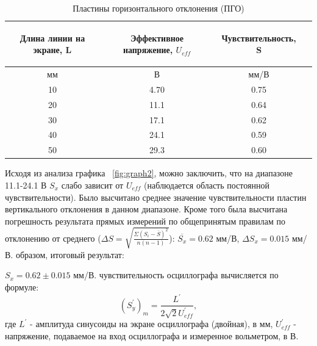 \begin{center}
\begin{table}[h!]
\centering
\caption{Пластины горизонтального отклонения (ПГО)}
\label{tabl:2}
\begin{tabular}{|c|c|c|c|}
\hline
\begin{minipage}{5cm}
\begin{center}
    Длина линии на экране, L
\end{center}
\end{minipage} &
\begin{minipage}{5cm}
\begin{center}
    Эффективное напряжение, $U_{eff}$
    \end{center}
\end{minipage} &
\begin{minipage}{5cm}
\begin{center}
    Чувствительность, S
    \end{center}
\end{minipage}\\
\hline
мм&В&мм/В\\
\hline
10  &  4.70  &  0.75 \\
20  &  11.1  &  0.64\\
30  &  17.1  &  0.62 \\
40  &  24.1  &  0.59 \\
50  &  29.3  &  0.60 \\

\hline
\end{tabular}
\end{table}
\end{center}
Исходя из анализа графика ~\ref{fig:graph2}, можно заключить, что на диапазоне 11.1-24.1 В $S_x$ слабо зависит от $U_{eff}$ (наблюдается область постоянной чувствительности). Было высчитано среднее значение чувствительности пластин вертикального отклонения в данном диапазоне. Кроме того была высчитана погрешность результата прямых измерений по общепринятым правилам по отклонению от среднего ($\Delta S=\sqrt{\frac{\Sigma{(S_i-\overline{S})^2}}{n(n-1)}}$): $\overline{S_x}=0.62$ мм/В, $\Delta{S_x}=0.015$ мм/В.
 образом, итоговый результат:
\par$S_x = 0.62 \pm 0.015$ мм/В.
 чувствительность осциллографа вычисляется по формуле:
\begin{equation}
   (S^{'}_y)_m=\frac{L^{'}}{2\sqrt{2}U^{'}_{eff}},
\end{equation}
где $L^{'}$ - амплитуда синусоиды на экране осциллографа (двойная), в мм, $U^{'}_{eff}$ - напряжение, подаваемое на вход осциллографа и измеренное вольметром, в В.
